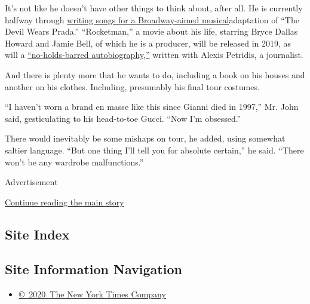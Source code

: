 It's not like he doesn't have other things to think about, after all. He
is currently halfway through
\href{https://www.nytimes.com/2017/01/26/theater/the-devil-wears-prada-aims-for-broadway-as-musical.html?rref=collection\%2Ftimestopic\%2FJohn\%2C\%20Elton\&action=click\&contentCollection=timestopics\&region=stream\&module=stream_unit\&version=latest\&contentPlacement=5\&pgtype=collection}{writing
songs for a Broadway-aimed musical}adaptation of ``The Devil Wears
Prada.'' ``Rocketman,'' a movie about his life, starring Bryce Dallas
Howard and Jamie Bell, of which he is a producer, will be released in
2019, as will a
\href{https://www.nytimes.com/2016/10/13/arts/music/elton-john-autobiography.html?rref=collection\%2Ftimestopic\%2FJohn\%2C\%20Elton\&action=click\&contentCollection=timestopics\&region=stream\&module=stream_unit\&version=latest\&contentPlacement=1\&pgtype=collection}{``no-holds-barred
autobiography,''} written with Alexis Petridis, a journalist.

And there is plenty more that he wants to do, including a book on his
houses and another on his clothes. Including, presumably his final tour
costumes.

``I haven't worn a brand en masse like this since Gianni died in 1997,''
Mr. John said, gesticulating to his head-to-toe Gucci. ``Now I'm
obsessed.''

There would inevitably be some mishaps on tour, he added, using somewhat
saltier language. ``But one thing I'll tell you for absolute certain,''
he said. ``There won't be any wardrobe malfunctions.''

Advertisement

\protect\hyperlink{after-bottom}{Continue reading the main story}

\hypertarget{site-index}{%
\subsection{Site Index}\label{site-index}}

\hypertarget{site-information-navigation}{%
\subsection{Site Information
Navigation}\label{site-information-navigation}}

\begin{itemize}
\tightlist
\item
  \href{https://help.nytimes.com/hc/en-us/articles/115014792127-Copyright-notice}{©~2020~The
  New York Times Company}
\end{itemize}

